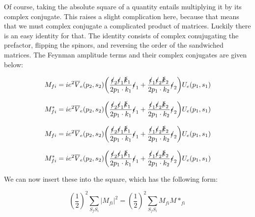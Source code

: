 \documentclass[a4]{article}
\begin{document}
    Of course, taking the absolute square of a quantity entails multiplying it by its complex conjugate. This raises a slight complication here, because that means that we must complex conjugate a complicated product of matrices. Luckily there is an easy identity for that. The identity
    consists of complex conujugating the prefactor, flipping the spinors, and reversing the order of the sandwiched matrices. The Feynman amplitude terms and their complex conjugates are given below:

    \begin{equation}
        M_{fi} = i e^2 \overline{V}_e (p_2, s_2) \bigg( \frac{\slashed{\epsilon}_2 \slashed{\epsilon}_1 \slashed{k}_1}{2 p_1 \cdot k_1} \slashed{\epsilon}_1  + \frac{\slashed{\epsilon}_1 \slashed{\epsilon}_2 \slashed{k}_2}{2 p_1 \cdot k_2} \slashed{\epsilon}_2 \bigg) U_e (p_1, s_1)
    \end{equation}

    \begin{equation}
        M_{fi}^* = i e^2 \overline{V}_e (p_2, s_2) \bigg( \frac{\slashed{\epsilon}_2 \slashed{\epsilon}_1 \slashed{k}_1}{2 p_1 \cdot k_1} \slashed{\epsilon}_1  + \frac{\slashed{\epsilon}_1 \slashed{\epsilon}_2 \slashed{k}_2}{2 p_1 \cdot k_2} \slashed{\epsilon}_2 \bigg) U_e (p_1, s_1)
    \end{equation}

    \begin{equation}
        M_{fi} = i e^2 \overline{V}_e (p_2, s_2) \bigg( \frac{\slashed{\epsilon}_2 \slashed{\epsilon}_1 \slashed{k}_1}{2 p_1 \cdot k_1} \slashed{\epsilon}_1  + \frac{\slashed{\epsilon}_1 \slashed{\epsilon}_2 \slashed{k}_2}{2 p_1 \cdot k_2} \slashed{\epsilon}_2 \bigg) U_e (p_1, s_1)
    \end{equation}

    \begin{equation}
        M_{fi}^* = i e^2 \overline{V}_e (p_2, s_2) \bigg( \frac{\slashed{\epsilon}_2 \slashed{\epsilon}_1 \slashed{k}_1}{2 p_1 \cdot k_1} \slashed{\epsilon}_1  + \frac{\slashed{\epsilon}_1 \slashed{\epsilon}_2 \slashed{k}_2}{2 p_1 \cdot k_2} \slashed{\epsilon}_2 \bigg) U_e (p_1, s_1)
    \end{equation}

    We can now insert these into the square, which has the following form:

    \begin{equation}
        (\frac{1}{2})^2 \sum_{S_f S_i} |M_{f i}|^2 = (\frac{1}{2})^2 \sum_{S_f S_i} M_{fi} M*_{fi}
    \end{equation}
\end{document}
